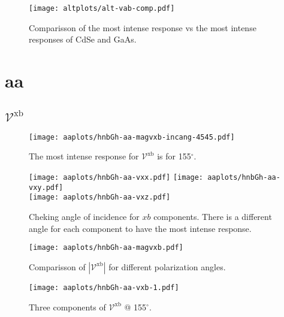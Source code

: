 \documentclass{article}
\let\Oldsection\section
\renewcommand{\section}{\FloatBarrier\Oldsection}
\let\Oldsubsection\subsection
\renewcommand{\subsection}{\FloatBarrier\Oldsubsection}
\begin{document}
\begin{figure}[ht]
    \centering
    \texttt{[image: altplots/alt-vab-comp.pdf]}
    \caption{Comparisson of the most intense response vs the most intense
    responses of CdSe and GaAs.}
    \label{fig:alt-comp}
\end{figure}



\section{aa} %
\label{sec:aa}


\subsection{$\mathcal{V}^{\mathrm{xb}} $}
\begin{figure}[h!]
    \centering
    \texttt{[image: aaplots/hnbGh-aa-magvxb-incang-4545.pdf]}
    \caption{The most intense response for $\mathcal{V}^{\mathrm{xb}} $ is for 
    155$^{\circ}$.}
    \label{fig:aa-magvxbincang}
\end{figure}
\begin{figure}[h!]
    \centering
    \texttt{[image: aaplots/hnbGh-aa-vxx.pdf]}
    \texttt{[image: aaplots/hnbGh-aa-vxy.pdf]}\\
    \texttt{[image: aaplots/hnbGh-aa-vxz.pdf]}
    \caption{Cheking angle of incidence for $xb$ components. There is a
    different angle for each component to have the most intense response.}
    \label{fig:aa-xbangcomp}
\end{figure}
\begin{figure}[ht!]
    \centering
    \texttt{[image: aaplots/hnbGh-aa-magvxb.pdf]}
    \caption{Comparisson of $|\mathcal{V}^{\mathrm{xb}}|$ for different
    polarization angles.}
    \label{fig:aa-magvxb}
\end{figure}
\begin{figure}[ht!]
    \centering
    \texttt{[image: aaplots/hnbGh-aa-vxb-1.pdf]}
    \caption{Three components of $\mathcal{V}^{\mathrm{xb}} $ @ 155$^{\circ}$.}
    \label{fig:aa-vxb1}
\end{figure}
\end{document}
